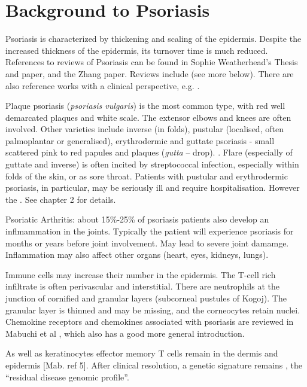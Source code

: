 \documentclass[a4paper,10pt]{report}
\begin{document}
\section{Background to Psoriasis}

Psoriasis is characterized by thickening and scaling of the epidermis. Despite the increased thickness of the epidermis, its turnover time is much reduced. References to reviews of Psoriasis can be found in Sophie Weatherhead's Thesis and paper, and the Zhang paper. Reviews include \cite{lowes2007pathogenesis, griffiths2007pathogenesis} (see more below). There are also reference works with a clinical perspective, e.g. \cite{camisa2008handbook}. 

Plaque psoriasis ({\em psoriasis vulgaris}) is the most common type, with red well demarcated plaques and white scale. The extensor elbows and knees are often involved. Other varieties include inverse (in folds), pustular (localised, often palmoplantar or generalised), erythrodermic and guttate psoriasis - small scattered pink to red papules and plaques ({\em gutta} -- drop). . Flare (especially of guttate and inverse) is often incited by streptococcal infection, especially within folds of the skin, or as sore throat. Patients with pustular and erythrodermic psoriasis, in particular, may be seriously ill and require hospitalisation. However the . See \cite{camisa2008handbook} chapter 2 for details. 

Psoriatic Arthritis: about 15\%-25\% of psoriasis patients also develop an inflmammation in the joints. Typically the patient will experience psoriasis for months or years before joint involvement. May lead to severe joint damamge. Inflammation may also affect other organs (heart, eyes, kidneys, lungs). 

Immune cells may increase their number in the epidermis. The T-cell rich infiltrate is often perivascular and interstitial. There are neutrophils at the junction of cornified and granular layers (subcorneal pustules of Kogoj). The  granular layer is thinned and may be missing, and the corneocytes retain nuclei. Chemokine receptors and chemokines associated with psoriasis are reviewed in Mabuchi et al \cite{mabuchi2012chemokine}, which also  has a good more general introduction.

As well as keratinocytes effector memory T cells remain in the dermis and epidermis [Mab. ref 5]. After clinical resolution, a genetic signature remains \cite{suarez2011resolved}, the ``residual disease genomic profile''. 
\end{document}
